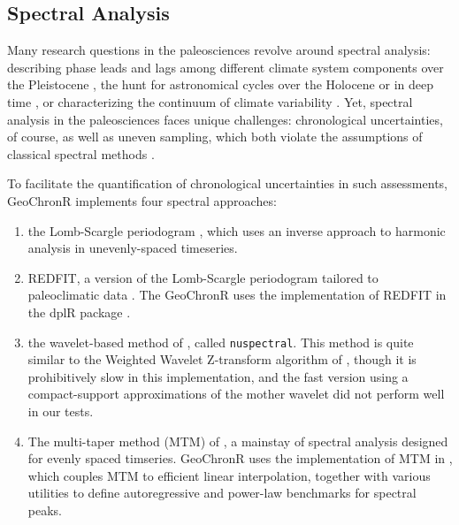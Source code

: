 \documentclass[gchron, manuscript]{copernicus}
\begin{document}
\hypertarget{sec:spec_theory}{%
\subsection{Spectral Analysis}\label{sec:spec_theory}}

Many research questions in the paleosciences revolve around spectral analysis: describing phase leads and lags among different climate system components over the Pleistocene \citep[SPECMAP,][]{imbrie1984orbital}, the hunt for astronomical cycles over the Holocene \citep[\citet{bond2001}]{mill_monograph} or in deep time \citep[\citet{Meyers_2012},\citet{Meyers_2015}]{MeyersSageman_2007}, or characterizing the continuum of climate variability \citep[\citet{ZhuPNAS2019}]{Huybers_Curry2006}.
Yet, spectral analysis in the paleosciences faces unique challenges: chronological uncertainties, of course, as well as uneven sampling, which both violate the assumptions of classical spectral methods \citep{Ghil02}.

To facilitate the quantification of chronological uncertainties in such assessments, GeoChronR implements four spectral approaches:

\begin{enumerate}
\def\labelenumi{\arabic{enumi}.}
\item
  the Lomb-Scargle periodogram \citep{VanderPlas_2018}, which uses an inverse approach to harmonic analysis in unevenly-spaced timeseries.
\item
  REDFIT, a version of the Lomb-Scargle periodogram tailored to paleoclimatic data \citep[\citet{Mudelsee_02}, \citet{Mudelsee_NPG09}]{SchulzMudelsee_02}.
  The GeoChronR uses the implementation of REDFIT in the dplR package \citep{Bunn2008115}.
\item
  the wavelet-based method of \citet{Mathias_JSS04}, called \texttt{nuspectral}. This method is quite similar to the Weighted Wavelet Z-transform algorithm of \citet{Foster_AJ96}, though it is prohibitively slow in this implementation, and the fast version using a compact-support approximations of the mother wavelet did not perform well in our tests.
\item
  The multi-taper method (MTM) of \citet{thomson82}, a mainstay of spectral analysis \citep{Ghil02} designed for evenly spaced timseries.
  GeoChronR uses the implementation of MTM in \citet{astrochron}, which couples MTM to efficient linear interpolation, together with various utilities to define autoregressive and power-law benchmarks for spectral peaks.
\end{enumerate}
\end{document}
